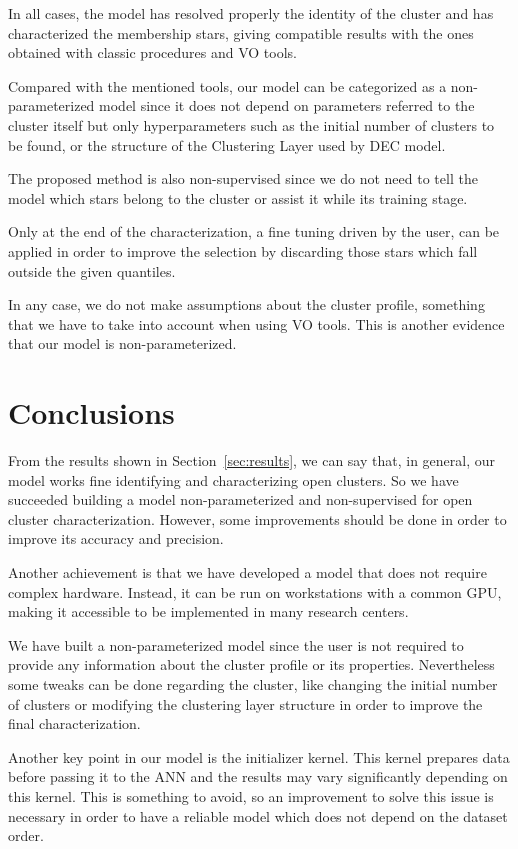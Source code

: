\documentclass[11pt,a4paper,english,twocolumn]{article}
\begin{document}
In all cases, the model has resolved properly the identity of the cluster
and has characterized the membership stars, giving compatible results
with the ones obtained with classic procedures and VO tools.

Compared with the mentioned tools, our model can be categorized as a
non-parameterized model since it does not depend on parameters referred
to the cluster itself but only hyperparameters such as the initial number
of clusters to be found, or the structure of the Clustering Layer used by DEC model.

The proposed method is also non-supervised since we do not need to tell the model
which stars belong to the cluster or assist it while its training stage.

Only at the end of the characterization, a fine tuning driven by the user,
can be applied in order to improve the selection by discarding those
stars which fall outside the given quantiles.

In any case, we do not make assumptions about the cluster profile,
something that we have to take into account when using VO tools.
This is another evidence that our model is non-parameterized.

\section{Conclusions}

From the results shown in Section~\ref{sec:results}, we can say that, in general,
our model works fine identifying and characterizing open clusters.
So we have succeeded building a model non-parameterized and non-supervised
for open cluster characterization. However, some improvements should be done
in order to improve its accuracy and precision.

Another achievement is that we have developed a model that does not require
complex hardware. Instead, it can be run on workstations with a common GPU,
making it accessible to be implemented in many research centers.

We have built a non-parameterized model since the user is not required to provide
any information about the cluster profile or its properties.
Nevertheless some tweaks can be done regarding the cluster, like changing the initial
number of clusters or modifying the clustering layer structure in order to improve
the final characterization.

Another key point in our model is the initializer kernel.
This kernel prepares data before passing it to the ANN
and the results may vary significantly depending on this kernel.
This is something to avoid, so an improvement to solve this issue is necessary
in order to have a reliable model which does not depend on the dataset order.
\end{document}
